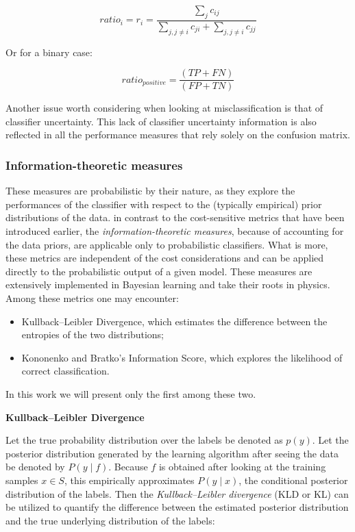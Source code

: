\documentclass[11pt,]{article}
\providecommand{\tightlist}{%
  \setlength{\itemsep}{0pt}\setlength{\parskip}{0pt}}
\begin{document}
\begin{equation}
ratio_i = r_i = \frac{\sum_j c_{ij}}
  {\sum_{j, j \neq i} c_{ji} + \sum_{j, j \neq i} c_{jj}}
\end{equation}

Or for a binary case:

\begin{equation}
ratio_{positive} = \frac{(TP + FN)}{(FP + TN)}
\end{equation}

Another issue worth considering when looking at misclassification is
that of classifier uncertainty. This lack of classifier uncertainty
information is also reflected in all the performance measures that rely
solely on the confusion matrix.

\hypertarget{information-theoretic-measures}{%
\subsubsection{Information-theoretic
measures}\label{information-theoretic-measures}}

These measures are probabilistic by their nature, as they explore the
performances of the classifier with respect to the (typically empirical)
prior distributions of the data. in contrast to the cost-sensitive
metrics that have been introduced earlier, the
\emph{information-theoretic measures}, because of accounting for the
data priors, are applicable only to probabilistic classifiers. What is
more, these metrics are independent of the cost considerations and can
be applied directly to the probabilistic output of a given model. These
measures are extensively implemented in Bayesian learning and take their
roots in physics. Among these metrics one may encounter:

\begin{itemize}
\tightlist
\item
  Kullback--Leibler Divergence, which estimates the difference between
  the entropies of the two distributions;
\item
  Kononenko and Bratko's Information Score, which explores the
  likelihood of correct classification.
\end{itemize}

In this work we will present only the first among these two.

\textbf{Kullback--Leibler Divergence}

Let the true probability distribution over the labels be denoted as
\(p(y)\). Let the posterior distribution generated by the learning
algorithm after seeing the data be denoted by \(P (y \mid f)\). Because
\(f\) is obtained after looking at the training samples \(x \in S\),
this empirically approximates \(P (y \mid x)\), the conditional
posterior distribution of the labels. Then the \emph{Kullback--Leibler
divergence} (KLD or KL) can be utilized to quantify the difference
between the estimated posterior distribution and the true underlying
distribution of the labels:
\end{document}
